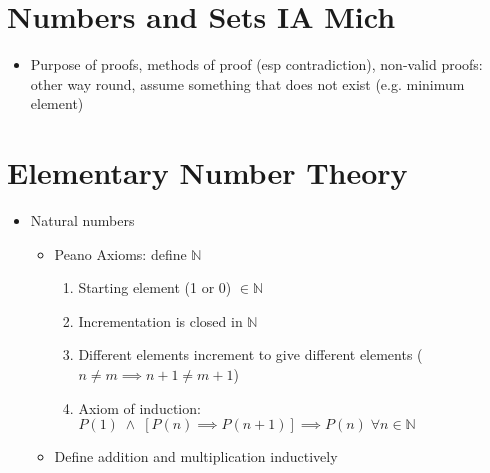 \documentclass[12pt]{article}
\begin{document}
\section*{Numbers and Sets \hfill IA Mich} 
\begin{itemize}
\item Purpose of proofs, methods of proof (esp contradiction), non-valid proofs: other way round, assume something that does not exist (e.g. minimum element)
\end{itemize}

\section{Elementary Number Theory}
\begin{itemize}
\item Natural numbers
\begin{itemize}
    \item Peano Axioms: define $\mathbb{N}$
    \begin{enumerate}
        \item Starting element (1 or 0) $\in \mathbb{N}$ 
        \item Incrementation is closed in $\mathbb{N}$
        \item Different elements increment to give different elements ($n \neq m \implies n+1 \neq m+1 $)
        \item Axiom of induction: $P(1) \; \wedge \; \left[ P(n) \implies P(n+1) \right] \implies P(n) \; \forall n \in \mathbb{N}$ 
    \end{enumerate}
    
    \item Define addition and multiplication inductively 
\end{itemize}


\end{itemize}
\end{document}
